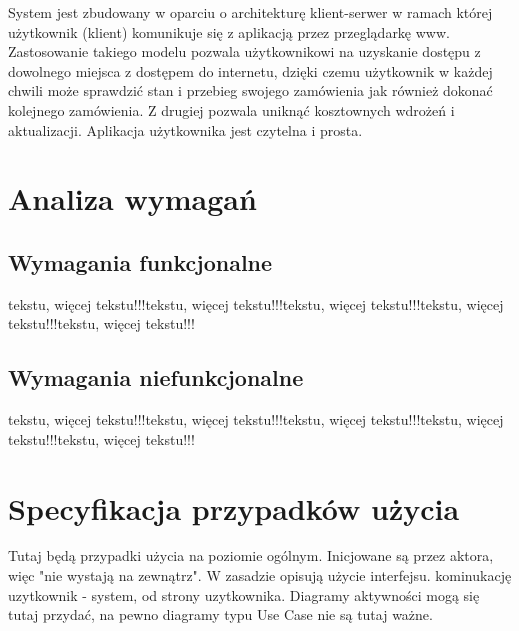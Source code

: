 \documentclass[10pt,a4paper,titlepage]{article} %
\begin{document}
		System jest zbudowany w oparciu o architekturę klient-serwer w ramach
		której użytkownik (klient) komunikuje się z aplikacją przez przeglądarkę
		www. Zastosowanie takiego modelu pozwala użytkownikowi na uzyskanie dostępu
		z dowolnego miejsca z dostępem do internetu, dzięki czemu użytkownik w każdej
		chwili może sprawdzić stan i przebieg swojego zamówienia jak również dokonać
		kolejnego zamówienia. Z drugiej pozwala uniknąć kosztownych wdrożeń i aktualizacji.
		Aplikacja użytkownika jest czytelna i prosta.\\

	\section{Analiza wymagań}
		\subsection{Wymagania funkcjonalne}
		    tekstu, więcej tekstu!!!tekstu, więcej tekstu!!!tekstu, więcej tekstu!!!tekstu, więcej tekstu!!!tekstu, więcej tekstu!!!
		\subsection{Wymagania niefunkcjonalne}
		    tekstu, więcej tekstu!!!tekstu, więcej tekstu!!!tekstu, więcej tekstu!!!tekstu, więcej tekstu!!!tekstu, więcej tekstu!!!
	
	
	\section{Specyfikacja przypadków użycia}	
	
		Tutaj będą przypadki użycia na poziomie ogólnym. Inicjowane są przez aktora, więc "nie wystają na zewnątrz". W zasadzie opisują użycie interfejsu. kominukację uzytkownik - system, od strony uzytkownika.\newline
		Diagramy aktywności mogą się tutaj przydać, na pewno diagramy typu Use Case nie są tutaj ważne.\newline
\end{document}
